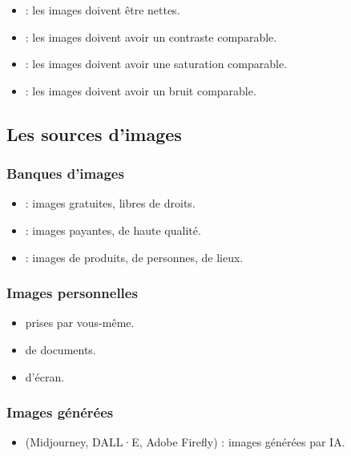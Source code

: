 \begin{itemize}
    \item {} : les images doivent être nettes.
    \item {} : les images doivent avoir un contraste comparable.
    \item {} : les images doivent avoir une saturation comparable.
    \item {} : les images doivent avoir un bruit comparable.
\end{itemize}

\subsection{Les sources d'images}

\subsubsection{Banques d'images}

\begin{itemize}
    \item {} : images gratuites, libres de droits.
    \item {} : images payantes, de haute qualité.
    \item {} : images de produits, de personnes, de lieux.
\end{itemize}

\subsubsection{Images personnelles}

\begin{itemize}
    \item {} prises par vous-même.
    \item {} de documents.
    \item {} d'écran.
\end{itemize}

\subsubsection{Images générées}

\begin{itemize}
    \item {} (Midjourney, DALL·E, Adobe Firefly) : images générées par IA.
\end{itemize}

